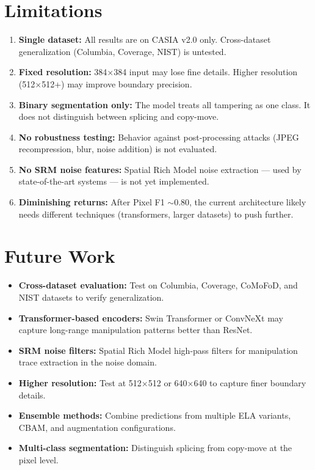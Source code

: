 \documentclass[conference]{IEEEtran}
\begin{document}
\section{Limitations}

\begin{enumerate}
    \item \textbf{Single dataset:} All results are on CASIA v2.0 only. Cross-dataset generalization (Columbia, Coverage, NIST) is untested.
    \item \textbf{Fixed resolution:} 384$\times$384 input may lose fine details. Higher resolution (512$\times$512+) may improve boundary precision.
    \item \textbf{Binary segmentation only:} The model treats all tampering as one class. It does not distinguish between splicing and copy-move.
    \item \textbf{No robustness testing:} Behavior against post-processing attacks (JPEG recompression, blur, noise addition) is not evaluated.
    \item \textbf{No SRM noise features:} Spatial Rich Model noise extraction --- used by state-of-the-art systems --- is not yet implemented.
    \item \textbf{Diminishing returns:} After Pixel F1 $\sim$0.80, the current architecture likely needs different techniques (transformers, larger datasets) to push further.
\end{enumerate}


\section{Future Work}

\begin{itemize}
    \item \textbf{Cross-dataset evaluation:} Test on Columbia, Coverage, CoMoFoD, and NIST datasets to verify generalization.
    \item \textbf{Transformer-based encoders:} Swin Transformer or ConvNeXt may capture long-range manipulation patterns better than ResNet.
    \item \textbf{SRM noise filters:} Spatial Rich Model high-pass filters for manipulation trace extraction in the noise domain.
    \item \textbf{Higher resolution:} Test at 512$\times$512 or 640$\times$640 to capture finer boundary details.
    \item \textbf{Ensemble methods:} Combine predictions from multiple ELA variants, CBAM, and augmentation configurations.
    \item \textbf{Multi-class segmentation:} Distinguish splicing from copy-move at the pixel level.
\end{itemize}
\end{document}
